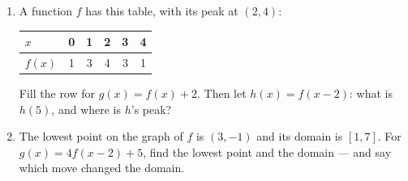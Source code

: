 \documentclass[aspectratio=169, 11pt]{beamer}
\begin{document}
\begin{frame}[t, plain]

  \begin{enumerate}\setlength{\itemsep}{10pt}
    \item A function \(f\) has this table, with its peak at \((2, 4)\):

          \smallskip
          \begin{tabular}{|l|c|c|c|c|c|}
          \hline
          \(x\) & 0 & 1 & 2 & 3 & 4 \\
          \hline
          \(f(x)\) & 1 & 3 & 4 & 3 & 1 \\
          \hline
          \end{tabular}

          \smallskip
          Fill the row for \(g(x) = f(x) + 2\). Then let \(h(x) = f(x-2)\):
          what is \(h(5)\), and where is \(h\)'s peak?

    \item The lowest point on the graph of \(f\) is \((3, -1)\) and its domain
          is \([1, 7]\). For \(g(x) = 4f(x-2) + 5\), find the lowest point and
          the domain --- and say which move changed the domain.
  \end{enumerate}
\end{frame}
\end{document}
